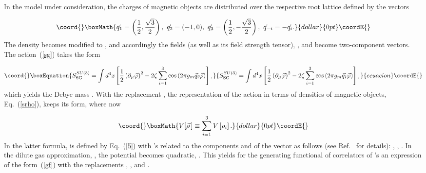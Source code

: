 \documentclass[a4paper,12pt]{article}
\begin{document}
In the model under consideration, the charges of magnetic objects are distributed over the respective root lattice 
defined by the vectors

$$\coord{}\boxMath{\vec q_1=\left(\frac12,\frac{\sqrt{3}}{2}\right),~ 
\vec q_2=(-1,0),~
\vec q_3=\left(\frac12,-\frac{\sqrt{3}}{2}\right),~
\vec q_{-i}=-\vec q_i.}{dollar}{0pt}\coordE{}$$
The density \coordHE{} becomes modified to \coordHE{}, and 
accordingly the fields \coordHE{} (as well as its field strength tensor),
\coordHE{}, and \myHighlight{$\varphi$}\coordHE{} become two-component vectors. The action~(\ref{sg}) takes the form

\begin{equation}\coord{}\boxEquation{
\label{sg3}
S_{\rm SG}^{SU(3)}=\int d^4x\left[\frac12\left(\partial_\mu\vec\varphi\right)^2-2\zeta\sum\limits_{i=1}^{3}\cos\left(2\pi g_m
\vec q_i\vec\varphi\right)\right],
}{
S_{\rm SG}^{SU(3)}=\int d^4x\left[\frac12\left(\partial_\mu\vec\varphi\right)^2-2\zeta\sum\limits_{i=1}^{3}\cos\left(2\pi g_m
\vec q_i\vec\varphi\right)\right],
}{ecuacion}\coordE{}\end{equation}
which yields the Debye mass \coordHE{}. With the replacement \myHighlight{$\rho\to\vec\rho$}\coordHE{},
the representation of the action in terms of 
densities of magnetic objects, Eq.~(\ref{srho}), keeps its form, where now 

$$\coord{}\boxMath{V[\vec\rho{\,}]\equiv\sum\limits_{i=1}^{3}V\left[\rho_i\right].}{dollar}{0pt}\coordE{}$$
In the latter formula, \coordHE{} is defined by Eq.~(\ref{5}) with \coordHE{}'s related to the components \coordHE{} and \coordHE{}
of the vector \myHighlight{$\vec\rho$}\coordHE{} as follows (see Ref.~\cite{su3} for details): 
\coordHE{}, 
\coordHE{}, \coordHE{}. In the dilute gas approximation, \myHighlight{$|\vec\rho{\,}|\ll\zeta$}\coordHE{}, the potential \coordHE{}
becomes quadratic, 
\coordHE{}. This yields for the generating functional \coordHE{} of correlators of \myHighlight{$\vec\rho{\,}$}\coordHE{}'s an expression of the form~(\ref{gf})
with the replacements \coordHE{}, \coordHE{}, and \coordHE{}. 
\end{document}
